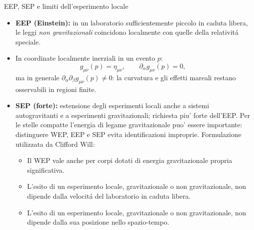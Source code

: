 \begin{frame}[t]{EEP, SEP e limiti dell'esperimento locale}\small\raggedright
\begin{itemize}
\item \textbf{EEP (Einstein):} in un laboratorio sufficientemente piccolo in caduta libera, le leggi \emph{non gravitazionali} coincidono localmente con quelle della relativit\'a speciale.
\item In coordinate localmente inerziali in un evento $p$:
\[
 g_{\mu\nu}(p)=\eta_{\mu\nu},\qquad \partial_\alpha g_{\mu\nu}(p)=0,
\]
ma in generale $\partial_\alpha\partial_\beta g_{\mu\nu}(p)\ne0$: la curvatura e gli effetti mareali restano osservabili in regioni finite.
\item \textbf{SEP (forte):} estensione degli esperimenti locali anche a sistemi autogravitanti e a esperimenti gravitazionali; richiesta piu' forte dell'EEP. Per le stelle compatte l'energia di legame gravitazionale puo' essere importante: distinguere WEP, EEP e SEP evita identificazioni improprie. Formulazione utilizzata da Clifford Will:
    \begin{itemize}
        \item Il WEP vale anche per corpi dotati di energia gravitazionale propria significativa.
        \item L'esito di un esperimento locale, gravitazionale o non gravitazionale, non dipende dalla velocit\'a del laboratorio in caduta libera.
        \item L'esito di un esperimento locale, gravitazionale o non gravitazionale, non dipende dalla sua posizione nello spazio-tempo.
    \end{itemize}
\end{itemize}
\end{frame}

